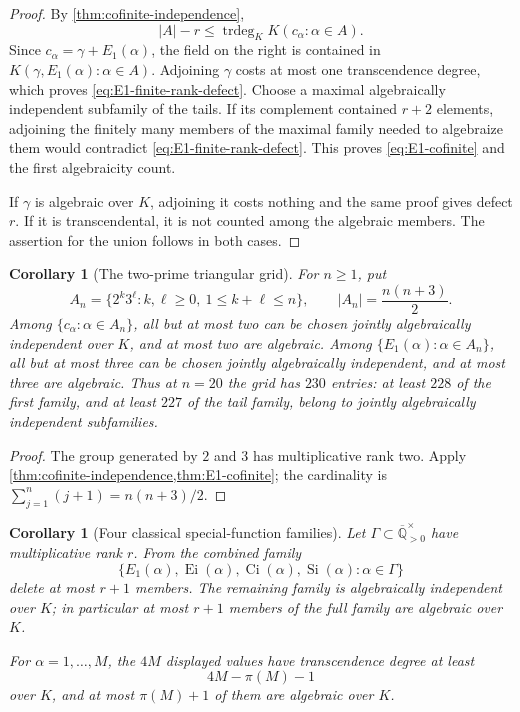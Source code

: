\documentclass[11pt]{article}
\theoremstyle{keio}
\newtheorem{corollary}[theorem]{Corollary}
\theoremstyle{definition}
\theoremstyle{remark}
\newcommand{\Qbar}{\overline{\mathbb Q}}
\newcommand{\Ei}{\operatorname{Ei}}
\newcommand{\Ci}{\operatorname{Ci}}
\newcommand{\trdeg}{\operatorname{trdeg}}
\begin{document}
\begin{proof}
By \cref{thm:cofinite-independence},
\[
 |A|-r\le\trdeg_KK(c_\alpha:\alpha\in A).
\]
Since \(c_\alpha=\gamma+E_1(\alpha)\), the field on the right is contained
in \(K(\gamma,E_1(\alpha):\alpha\in A)\).  Adjoining \(\gamma\) costs at
most one transcendence degree, which proves
\eqref{eq:E1-finite-rank-defect}.  Choose a maximal algebraically
independent subfamily of the tails.  If its complement contained \(r+2\)
elements, adjoining the finitely many members of the maximal family needed
to algebraize them would contradict \eqref{eq:E1-finite-rank-defect}.
This proves \eqref{eq:E1-cofinite} and the first algebraicity count.

If \(\gamma\) is algebraic over \(K\), adjoining it costs nothing and the
same proof gives defect \(r\).  If it is transcendental, it is not counted
among the algebraic members.  The assertion for the union follows in both
cases.
\end{proof}

\begin{corollary}[The two-prime triangular grid]
\label{cor:two-prime-grid}
For \(n\ge1\), put
\[
 A_n=\{2^k3^\ell:k,\ell\ge0,\ 1\le k+\ell\le n\},
 \qquad |A_n|=\frac{n(n+3)}2.
\]
Among \(\{c_\alpha:\alpha\in A_n\}\), all but at most two can be chosen
jointly algebraically independent over \(K\), and at most two are
algebraic.  Among \(\{E_1(\alpha):\alpha\in A_n\}\), all but at most three
can be chosen jointly algebraically independent, and at most three are
algebraic.  Thus at \(n=20\) the grid has \(230\) entries: at least \(228\)
of the first family, and at least \(227\) of the tail family, belong to
jointly algebraically independent subfamilies.
\end{corollary}

\begin{proof}
The group generated by \(2\) and \(3\) has multiplicative rank two.  Apply
\cref{thm:cofinite-independence,thm:E1-cofinite}; the cardinality is
\(\sum_{j=1}^n(j+1)=n(n+3)/2\).
\end{proof}

\begin{corollary}[Four classical special-function families]
\label{cor:four-classical-cofinite}
Let \(\Gamma\subset\Qbar_{>0}^{\times}\) have multiplicative rank \(r\).
From the combined family
\begin{equation}\label{eq:four-classical-family}
 \{E_1(\alpha),\Ei(\alpha),\Ci(\alpha),
   \operatorname{Si}(\alpha):\alpha\in\Gamma\}
\end{equation}
delete at most \(r+1\) members.  The remaining family is algebraically
independent over \(K\); in particular at most \(r+1\) members of the full
family are algebraic over \(K\).

For \(\alpha=1,\ldots,M\), the \(4M\) displayed values have transcendence
degree at least
\begin{equation}\label{eq:four-classical-integer-count}
 4M-\pi(M)-1
\end{equation}
over \(K\), and at most \(\pi(M)+1\) of them are algebraic over \(K\).
\end{corollary}
\end{document}
